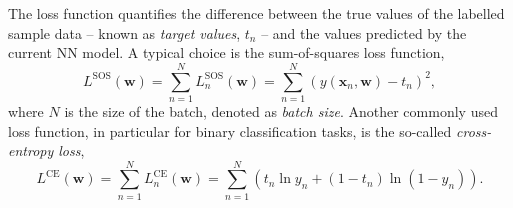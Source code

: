 
The loss function quantifies the difference between the true values of the labelled sample data -- known as \emph{target values}, $t_n$ -- and the values predicted by the current NN model. A typical choice is the sum-of-squares loss function,
\begin{equation}
    \label{eq:mean-squared-loss}
   L^{\text{SOS}}(\pmb{w}) = \sum _{n=1}^{N}L_n^{\text{SOS}}(\pmb{w})= \sum _{n=1}^{N}\left( y(\pmb{x}_n, \pmb{w})-t_n \right)^{2},
\end{equation}
where $N$ is the size of the batch, denoted as \emph{batch size}. 
Another commonly used loss function, in particular for binary classification tasks, is the so-called \emph{cross-entropy loss},
\begin{equation}
    \label{eq:cross-entropy-loss}
    L^{\text{CE}}(\pmb{w}) = \sum _{n=1}^{N}L_n^{\text{CE}}(\pmb{w}) = \sum _{n=1}^{N}\left( t_n \ln y_n + ( 1 - t_n) \ln (1 - y_n) \right).
\end{equation}


